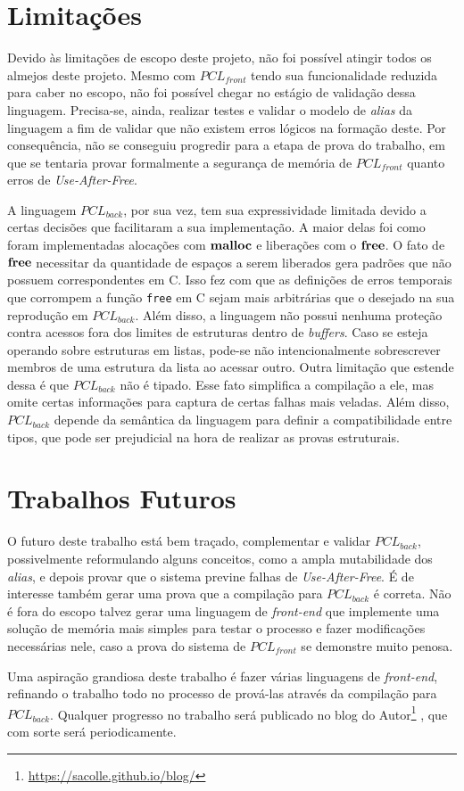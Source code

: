 \section{Limitações}

Devido às limitações de escopo deste projeto, não foi possível atingir todos os almejos deste projeto. Mesmo com $PCL_{front}$ tendo sua funcionalidade reduzida para caber no escopo, não foi possível chegar no estágio de validação dessa linguagem. Precisa-se, ainda, realizar testes e validar o modelo de \emph{alias} da linguagem a fim de validar que não existem erros lógicos na formação deste. Por consequência, não se conseguiu progredir para a etapa de prova do trabalho, em que se tentaria provar formalmente a segurança de memória de $PCL_{front}$ quanto erros de \emph{Use-After-Free}.

A linguagem $PCL_{back}$, por sua vez, tem sua expressividade limitada devido a certas decisões que facilitaram a sua implementação. A maior delas foi como foram implementadas alocações com $\mathbf{malloc}$ e liberações com o $\mathbf{free}$. O fato de $\mathbf{free}$ necessitar da quantidade de espaços a serem liberados gera padrões que não possuem correspondentes em C. Isso fez com que as definições de erros temporais que corrompem a função \lstinline[language=C]|free| em C sejam mais arbitrárias que o desejado na sua reprodução em $PCL_{back}$. Além disso, a linguagem não possui nenhuma proteção contra acessos fora dos limites de estruturas dentro de \emph{buffers}. Caso se esteja operando sobre estruturas em listas, pode-se não intencionalmente sobrescrever membros de uma estrutura da lista ao acessar outro. Outra limitação que estende dessa é que $PCL_{back}$ não é tipado. Esse fato simplifica a compilação a ele, mas omite certas informações para captura de certas falhas mais veladas. Além disso, $PCL_{back}$ depende da semântica da linguagem para definir a compatibilidade entre tipos, que pode ser prejudicial na hora de realizar as provas estruturais.

\section{Trabalhos Futuros}

O futuro deste trabalho está bem traçado, complementar e validar $PCL_{back}$, possivelmente reformulando alguns conceitos, como a ampla mutabilidade dos \emph{alias}, e depois provar que o sistema previne falhas de \emph{Use-After-Free}. É de interesse também gerar uma prova que a compilação para $PCL_{back}$ é correta. Não é fora do escopo talvez gerar uma linguagem de \emph{front-end} que implemente uma solução de memória mais simples para testar o processo e fazer modificações necessárias nele, caso a prova do sistema de $PCL_{front}$ se demonstre muito penosa.

Uma aspiração grandiosa deste trabalho é fazer várias linguagens de \emph{front-end}, refinando o trabalho todo no processo de prová-las através da compilação para $PCL_{back}$. Qualquer progresso no trabalho será publicado no blog do Autor\footnote{\url{https://sacolle.github.io/blog/}} , que com sorte será periodicamente. 